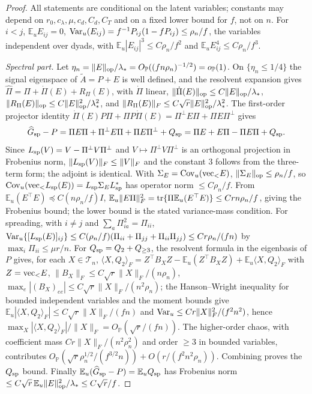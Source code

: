 \documentclass[12pt]{article}
\newcommand{\E}{\mathbb{E}}
\newcommand{\1}{\mathbf{1}}
\begin{document}
\begin{proof}
All statements are conditional on the latent variables; constants may depend on
$r_0,c_\lambda,\mu,c_d,C_d,C_T$ and on a fixed lower bound for $f$, not on $n$. For $i<j$,
$\E_u E_{ij}=0$, ${\rm Var}_u(E_{ij})=f^{-1}P_{ij}(1-fP_{ij})\le\rho_n/f$, the variables
independent over dyads, with $\E_u|E_{ij}|^3\le C\rho_n/f^2$ and $\E_u E_{ij}^4\le C\rho_n/f^3$.

\smallskip\noindent\emph{Spectral part.}
Let $\eta_n=\|E\|_{\rm op}/\lambda_*=O_{\mathbb P}((fn\rho_n)^{-1/2})=o_{\mathbb P}(1)$. On
$\{\eta_n\le 1/4\}$ the signal eigenspace of $\widetilde A=P+E$ is well defined, and the resolvent
expansion gives $\widehat\Pi=\Pi+\dot\Pi(E)+R_\Pi(E)$, with $\dot\Pi$ linear,
$\|\dot\Pi(E)\|_{\rm op}\le C\|E\|_{\rm op}/\lambda_*$, $\|R_\Pi(E)\|_{\rm op}\le C\|E\|_{\rm
op}^2/\lambda_*^2$, and $\|R_\Pi(E)\|_F\le C\sqrt r\|E\|_{\rm op}^2/\lambda_*^2$. The first-order
projector identity $\dot\Pi(E)P\Pi+\Pi P\dot\Pi(E)=\Pi^\perp E\Pi+\Pi E\Pi^\perp$ gives
\[
        \widehat G_{\rm sp}-P=\Pi E\Pi+\Pi^\perp E\Pi+\Pi E\Pi^\perp+Q_{\rm sp}
        =\Pi E+E\Pi-\Pi E\Pi+Q_{\rm sp}.
\]
Since $L_{\rm sp}(V)=V-\Pi^\perp V\Pi^\perp$ and $V\mapsto\Pi^\perp V\Pi^\perp$ is an orthogonal
projection in Frobenius norm, $\|L_{\rm sp}(V)\|_F\le\|V\|_F$ and the constant $3$ follows from the
three-term form; the adjoint is identical. With $\Sigma_E={\rm Cov}_u({\rm vec}_<E)$,
$\|\Sigma_E\|_{\rm op}\le\rho_n/f$, so ${\rm Cov}_u({\rm vec}_<L_{\rm sp}(E))=L_{\rm
sp}\Sigma_E L_{\rm sp}^*$ has operator norm $\le C\rho_n/f$. From $\E_u(E^\top E)\preceq
C(n\rho_n/f)I$, $\E_u\|E\Pi\|_F^2={\rm tr}\{\Pi\E_u(E^\top E)\}\le Crn\rho_n/f$, giving the
Frobenius bound; the lower bound is the stated variance-mass condition. For spreading, with $i\ne
j$ and $\sum_a\Pi_{ia}^2=\Pi_{ii}$, ${\rm Var}_u\{[L_{\rm sp}(E)]_{ij}\}\le
C(\rho_n/f)(\Pi_{ii}+\Pi_{jj}+\Pi_{ii}\Pi_{jj})\le Cr\rho_n/(fn)$ by $\max_i\Pi_{ii}\le\mu r/n$.
For $Q_{\rm sp}=Q_2+Q_{\ge3}$, the resolvent formula in the eigenbasis of $P$ gives, for each
$X\in\mathcal T_n$, $\langle X,Q_2\rangle_F=Z^\top B_XZ-\E_u(Z^\top B_XZ)+\E_u\langle
X,Q_2\rangle_F$ with $Z={\rm vec}_<E$, $\|B_X\|_F\le C\sqrt r\|X\|_F/(n\rho_n)$, $\max_e|(B_X)_{ee}|\le
C\sqrt r\|X\|_F/(n^2\rho_n)$; the Hanson--Wright inequality for bounded independent variables and the
moment bounds give $\E_u|\langle X,Q_2\rangle_F|\le C\sqrt r\|X\|_F/(fn)$ and ${\rm Var}_u\le
Cr\|X\|_F^2/(f^2n^2)$, hence $\max_X|\langle X,Q_2\rangle_F|/\|X\|_F=O_{\mathbb P}(\sqrt r/(fn))$.
The higher-order chaos, with coefficient mass $Cr\|X\|_F/(n^2\rho_n^2)$ and order $\ge3$ in bounded
variables, contributes $O_{\mathbb P}(\sqrt r\rho_n^{1/2}/(f^{3/2}n))+O(r/(f^2n^2\rho_n))$.
Combining proves the $Q_{\rm sp}$ bound. Finally $\E_u(\widehat G_{\rm sp}-P)=\E_uQ_{\rm sp}$ has
Frobenius norm $\le C\sqrt r\,\E_u\|E\|_{\rm op}^2/\lambda_*\le C\sqrt r/f$.


\end{proof}
\end{document}
